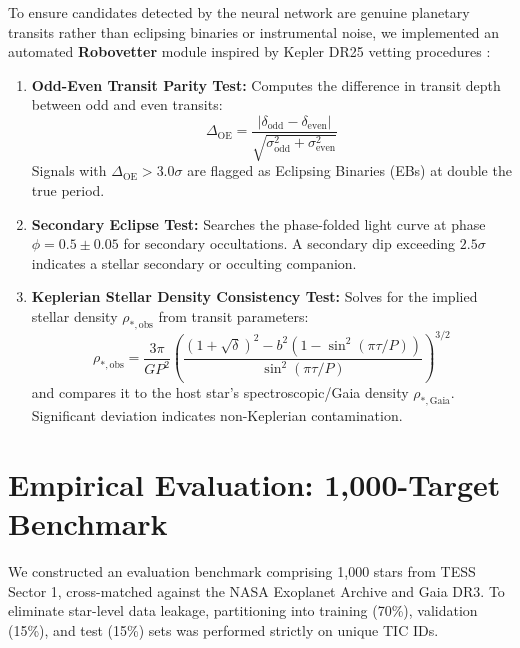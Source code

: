 \documentclass[11pt,a4paper]{article}
\begin{document}
To ensure candidates detected by the neural network are genuine planetary transits rather than eclipsing binaries or instrumental noise, we implemented an automated \textbf{Robovetter} module inspired by Kepler DR25 vetting procedures \citep{coughlin2016planetary, thompson2018planetary}:
\begin{enumerate}
    \item \textbf{Odd-Even Transit Parity Test:} Computes the difference in transit depth between odd and even transits:
    \begin{equation}
        \Delta_{\text{OE}} = \frac{|\delta_{\text{odd}} - \delta_{\text{even}}|}{\sqrt{\sigma_{\text{odd}}^2 + \sigma_{\text{even}}^2}}
    \end{equation}
    Signals with $\Delta_{\text{OE}} > 3.0\sigma$ are flagged as Eclipsing Binaries (EBs) at double the true period.
    \item \textbf{Secondary Eclipse Test:} Searches the phase-folded light curve at phase $\phi = 0.5 \pm 0.05$ for secondary occultations. A secondary dip exceeding $2.5\sigma$ indicates a stellar secondary or occulting companion.
    \item \textbf{Keplerian Stellar Density Consistency Test:} Solves for the implied stellar density $\rho_{*, \text{obs}}$ from transit parameters:
    \begin{equation}
        \rho_{*, \text{obs}} = \frac{3 \pi}{G P^2} \left( \frac{(1 + \sqrt{\delta})^2 - b^2 (1 - \sin^2(\pi \tau / P))}{\sin^2(\pi \tau / P)} \right)^{3/2}
    \end{equation}
    and compares it to the host star's spectroscopic/Gaia density $\rho_{*, \text{Gaia}}$. Significant deviation indicates non-Keplerian contamination.
\end{enumerate}

\section{Empirical Evaluation: 1,000-Target Benchmark}

We constructed an evaluation benchmark comprising 1,000 stars from TESS Sector 1, cross-matched against the NASA Exoplanet Archive and Gaia DR3. To eliminate star-level data leakage, partitioning into training (70\%), validation (15\%), and test (15\%) sets was performed strictly on unique TIC IDs.
\end{document}
